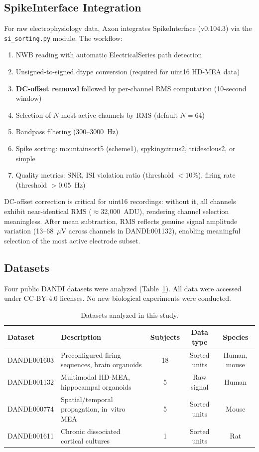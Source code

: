 \documentclass[11pt,a4paper]{article}
\begin{document}
\subsection{SpikeInterface Integration}

For raw electrophysiology data, Axon integrates SpikeInterface (v0.104.3) 
\citep{buccino2020} via the \texttt{si\_sorting.py} module. The workflow:

\begin{enumerate}
\item NWB reading with automatic ElectricalSeries path detection
\item Unsigned-to-signed dtype conversion (required for uint16 HD-MEA data)
\item \textbf{DC-offset removal} followed by per-channel RMS computation 
      (10-second window)
\item Selection of $N$ most active channels by RMS (default $N = 64$)
\item Bandpass filtering (300--3000~Hz)
\item Spike sorting: mountainsort5 (scheme1), spykingcircus2, tridesclous2, or simple
\item Quality metrics: SNR, ISI violation ratio (threshold $< 10\%$), 
      firing rate (threshold $> 0.05$~Hz)
\end{enumerate}

\noindent DC-offset correction is critical for uint16 recordings: without it, all 
channels exhibit near-identical RMS ($\approx$32,000~ADU), rendering channel 
selection meaningless. After mean subtraction, RMS reflects genuine signal amplitude 
variation (13--68~$\mu$V across channels in DANDI:001132), enabling meaningful 
selection of the most active electrode subset.

\subsection{Datasets}

Four public DANDI datasets were analyzed (Table~\ref{tab:datasets}). All data were 
accessed under CC-BY-4.0 licenses. No new biological experiments were conducted.

\begin{table}[h]
\centering
\caption{Datasets analyzed in this study.}
\label{tab:datasets}
\small
\begin{tabular}{lp{4.5cm}ccc}
\toprule
\textbf{Dataset} & \textbf{Description} & \textbf{Subjects} & 
\textbf{Data type} & \textbf{Species} \\
\midrule
DANDI:001603 \citep{vandermolen2026} & Preconfigured firing sequences, 
brain organoids & 18 & Sorted units & Human, mouse \\
DANDI:001132 & Multimodal HD-MEA, hippocampal organoids & 5 & 
Raw signal & Human \\
DANDI:000774 & Spatial/temporal propagation, in~vitro MEA & 5 & 
Sorted units & Mouse \\
DANDI:001611 & Chronic dissociated cortical cultures & 1 & 
Sorted units & Rat \\
\bottomrule
\end{tabular}
\end{table}
\end{document}
